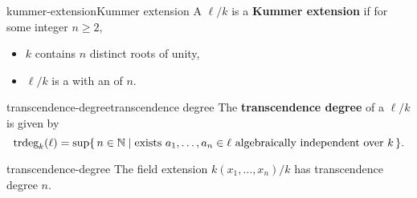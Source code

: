 \begin{topic}{kummer-extension}{Kummer extension}
    A  $\ell/k$ is a \textbf{Kummer extension} if for some integer $n \ge 2$,
    \begin{itemize}
        \item $k$ contains $n$ distinct roots of unity,
        \item $\ell/k$ is a  with an   of  $n$.
    \end{itemize}
\end{topic}

\begin{topic}{transcendence-degree}{transcendence degree}
    The \textbf{transcendence degree} of a  $\ell/k$ is given by
    \[ \textup{trdeg}_k(\ell) = \sup \{\, n \in \mathbb{N} \mid \textup{exists } a_1, \ldots, a_n \in \ell \textup{ algebraically independent over } k \,\} . \]
\end{topic}

\begin{example}{transcendence-degree}
    The field extension $k(x_1, \ldots, x_n) / k$ has transcendence degree $n$.
\end{example}
